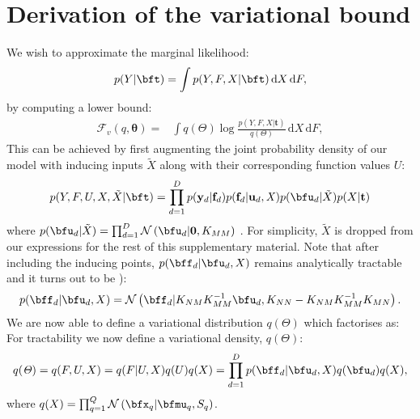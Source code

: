\section{Derivation of the variational bound}

We wish to approximate the marginal likelihood:
\begin{equation}
\label{marginalLikelihoodSuppl}
p(Y | \bft) =  \int p( Y , F, X| \bft) \, \mathrm{d} X \,\mathrm{d}F,
\end{equation}
by computing a lower bound:
\begin{align}
\mathcal{F}_v(q, \boldsymbol \theta) = {}& \int q(\mathit{\Theta}) \log 
		\frac{ p(Y , F , \mathit{X} | \mathbf{t})}
			 {q(\mathit{\Theta})}  \, \mathrm{d} X \,\mathrm{d}F,
		 \label{jensens1Suppl}
\end{align}
%
This can be achieved by first augmenting the joint probability density of our model with inducing inputs $\tilde{X}$ along with their corresponding function values $U$:
\begin{equation}
 \label{augmentedJointSuppl}
p(Y,F, U,X,\tilde{X} | \bft) = \prod_{d=1}^D p(\mathbf{y}_d | \mathbf{f}_d) p(\mathbf{f}_d | \mathbf{u}_d, \mathit{X})
p(\bfu_d | \tilde{X})  p(X | \mathbf{t})
\end{equation}
where $p(\bfu_d | \tilde{X}) = \prod_{d=1}^D \mathcal{N} \left( \bfu_d | \mathbf{0}, K_{MM} \right)$ . For simplicity, $\tilde{X}$ is dropped from our
expressions for the rest of this supplementary material. Note that after including the inducing points, $p(\bff_d | \bfu_d, X)$
remains analytically tractable and it turns out to be \cite{rasmussen-williams}):
\begin{equation}
 \label{priorF2Suppl}
p(\bff_d | \bfu_d, X) =  \mathcal{N}  \left( \bff_d | K_{NM} K_{MM}^{-1} \bfu_d , K_{NN} - K_{NM} K_{MM}^{-1} K_{MN} \right).
\end{equation}
We are now able to define a variational distribution $q(\Theta)$ which factorises as:
For tractability we now define a variational density, $q(\Theta)$:
\begin{equation}
\label{varDistrSuppl}
q(\mathit{\Theta}) = q(F, U,X) = q(F | U, X) q(U) q(X) = \prod_{d=1}^D p(\bff_d | \bfu_d, X )q(\bfu_d) q(X),
\end{equation}
%
%
where $q(X) = \prod_{q=1}^Q \mathcal{N} \left( \bfx_q | \bfmu_q, S_q \right)$. 
